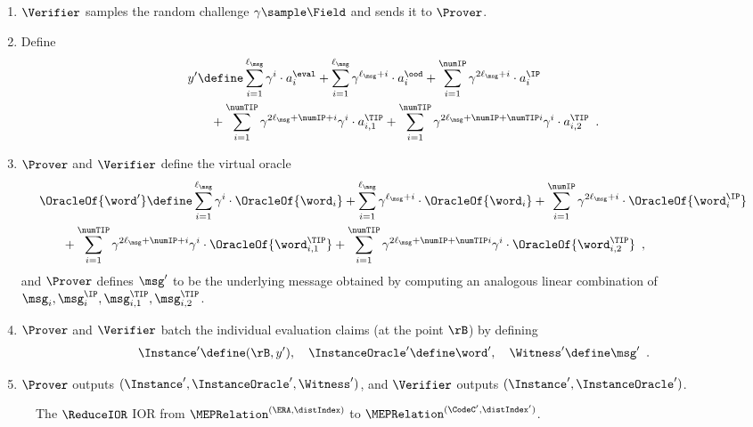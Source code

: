 \begin{tcolorbox}[breakable, enhanced, colback=white, boxrule=0.65pt]
        \begin{enumerate}[nolistsep]
        \item $\Verifier$ samples the random challenge $\gamma \sample \Field$ and sends it to $\Prover$.
        \item Define 
        \begin{align*}
            &y' \define \sum_{i=1}^{\ell_{\msg}} \gamma^{i} \cdot a^{\eval}_i + \sum_{i=1}^{\ell_{\msg}} \gamma^{\ell_{\msg} + i} \cdot a^{\ood}_i + \sum_{i=1}^{\numIP} \gamma^{2\ell_{\msg} + i} \cdot a^{\IP}_i\\
            &\quad \; \; \; + \sum_{i=1}^{\numTIP} \gamma^{2\ell_{\msg} + \numIP + i} \gamma^i \cdot a^{\TIP}_{i,1} + \sum_{i=1}^{\numTIP} \gamma^{2\ell_{\msg} + \numIP + \numTIP i} \gamma^i \cdot a^{\TIP}_{i,2} \enspace .
        \end{align*}
        \item $\Prover$ and $\Verifier$ define the virtual oracle
        \begin{align*}
            &\OracleOf{\word'} \define \sum_{i=1}^{\ell_{\msg}} \gamma^{i} \cdot \OracleOf{\word_i} + \sum_{i=1}^{\ell_{\msg}} \gamma^{\ell_{\msg} + i} \cdot \OracleOf{\word_i} + \sum_{i=1}^{\numIP} \gamma^{2\ell_{\msg} + i} \cdot \OracleOf{\word^{\IP}_i}\\
            &\quad \; \; \; + \sum_{i=1}^{\numTIP} \gamma^{2\ell_{\msg} + \numIP + i} \gamma^i \cdot \OracleOf{\word^{\TIP}_{i,1}} + \sum_{i=1}^{\numTIP} \gamma^{2\ell_{\msg} + \numIP + \numTIP i} \gamma^i \cdot \OracleOf{\word^{\TIP}_{i,2}} \enspace ,
        \end{align*}
        and $\Prover$ defines $\msg'$ to be the underlying message obtained by computing an analogous linear combination of  $\msg_i, \msg^{\IP}_i, \msg^{\TIP}_{i,1}, \msg^{\TIP}_{i,2}$.
        \item $\Prover$ and $\Verifier$ batch the individual evaluation claims (at the point $\rB$) by defining
        \begin{align*}
            \Instance' \define (\rB, y'), \quad
            \InstanceOracle' \define \word', \quad
            \Witness' \define \msg' \enspace .
        \end{align*}
        \item $\Prover$ outputs $(\Instance', \InstanceOracle', \Witness')$, and $\Verifier$ outputs $(\Instance', \InstanceOracle')$.
        \end{enumerate}
    \end{tcolorbox}
\begin{figure}[H]
    \vspace{-10pt}
    \caption{The $\ReduceIOR$ IOR from $\MEPRelation^{(\ERA, \distIndex)}$ to $\MEPRelation^{(\CodeC', \distIndex')}$.}
    \label{alg:reduce-ior}
\end{figure}